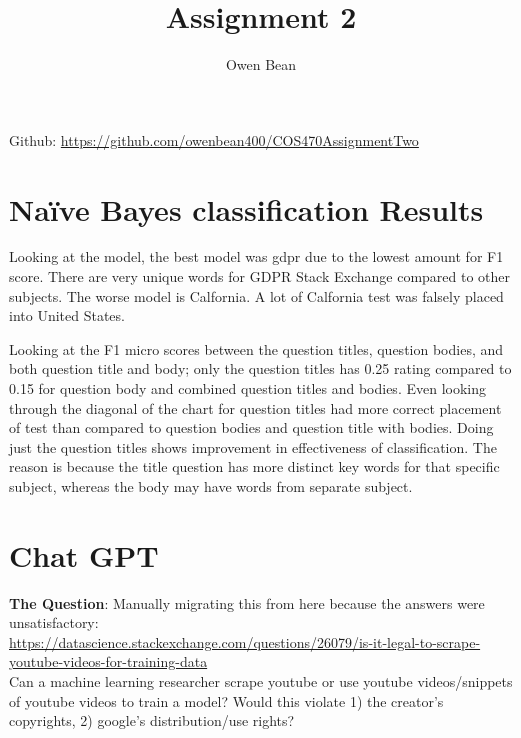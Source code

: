 \documentclass{article}
\title{Assignment 2}
\author{Owen Bean}
\begin{document}
\maketitle

Github: \href{https://github.com/owenbean400/COS470AssignmentTwo}{https://github.com/owenbean400/COS470AssignmentTwo}

\section{Naïve Bayes classification Results}


Looking at the model, the best model was gdpr due to the lowest amount for F1 score. There are very unique words for GDPR Stack Exchange compared to other subjects. The worse model is Calfornia. A lot of Calfornia test was falsely placed into United States. 

Looking at the F1 micro scores between the question titles, question bodies, and both question title and body; only the question titles has 0.25 rating compared to 0.15 for question body and combined question titles and bodies. Even looking through the diagonal of the chart for question titles had more correct placement of test than compared to question bodies and question title with bodies. Doing just the question titles shows improvement in effectiveness of classification. The reason is because the title question has more distinct key words for that specific subject, whereas the body may have words from separate subject.

\section{Chat GPT}

\textbf{The Question}: 
Manually migrating this from here because the answers were unsatisfactory: \\
\href{https://datascience.stackexchange.com/questions/26079/is-it-legal-to-scrape-youtube-videos-for-training-data}{https://datascience.stackexchange.com/questions/26079/is-it-legal-to-scrape-youtube-videos-for-training-data} \\

Can a machine learning researcher scrape youtube or use youtube videos/snippets of youtube videos to train a model? Would this violate 1) the creator's copyrights, 2) google's distribution/use rights? \\
\end{document}
